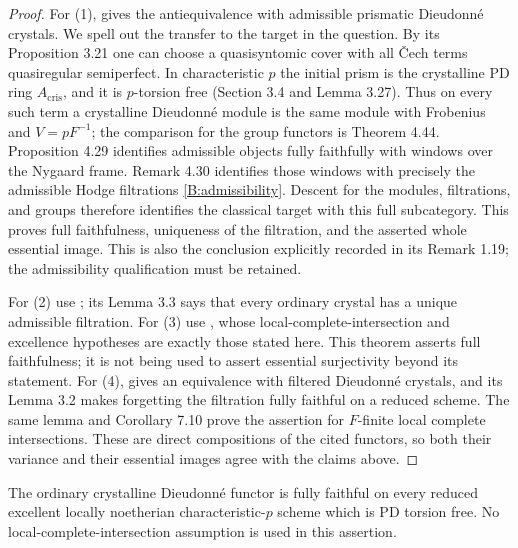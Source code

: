 \begin{proof}
For (1), \cite[Theorem 4.74]{B:ALB} gives the antiequivalence with
admissible prismatic Dieudonn\'e crystals. We spell out the transfer
to the target in the question. By its Proposition 3.21 one can choose
a quasisyntomic cover with all \v Cech terms quasiregular semiperfect.
In characteristic $p$ the initial prism is the crystalline PD ring
$A_{\mathrm{cris}}$, and it is $p$-torsion free
(Section 3.4 and Lemma 3.27). Thus on every such term a crystalline
Dieudonn\'e module is the same module with Frobenius and
$V=pF^{-1}$; the comparison for the group functors is Theorem 4.44.
Proposition 4.29 identifies admissible objects fully faithfully with
windows over the Nygaard frame. Remark 4.30 identifies those windows
with precisely the admissible Hodge filtrations
\eqref{B:admissibility}. Descent for the modules, filtrations, and
groups therefore identifies the classical target with this full
subcategory. This proves full faithfulness, uniqueness of the
filtration, and the asserted whole essential image. This is also
the conclusion explicitly recorded in its Remark 1.19; the
admissibility qualification must be retained.

For (2) use \cite[Theorem 7.6]{B:LauDivided}; its Lemma 3.3 says
that every ordinary crystal has a unique admissible filtration.
For (3) use \cite[Theorem 4.6]{B:deJongMessing1999}, whose
local-complete-intersection and excellence hypotheses are exactly
those stated here. This theorem asserts full faithfulness; it is
not being used to assert essential surjectivity beyond its statement.
For (4), \cite[Theorem 7.9]{B:LauDivided} gives an equivalence with
filtered Dieudonn\'e crystals, and its Lemma 3.2 makes forgetting
the filtration fully faithful on a reduced scheme. The same lemma
and Corollary 7.10 prove the assertion for $F$-finite local complete
intersections. These are direct compositions of the cited functors,
so both their variance and their essential images agree with the
claims above.
\end{proof}

\begin{proposition}
\label{B:reduced-PD-excellent}
The ordinary crystalline Dieudonn\'e functor is fully faithful on
every reduced excellent locally noetherian characteristic-$p$ scheme
which is PD torsion free. No local-complete-intersection assumption
is used in this assertion.
\end{proposition}

